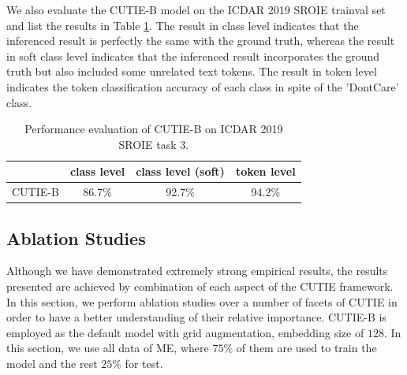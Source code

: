 \documentclass[10pt,twocolumn,letterpaper]{article}
\begin{document}
We also evaluate the CUTIE-B model on the ICDAR 2019 SROIE trainval set and list the results in Table \ref{tab:sroie}. The result in class level indicates that the inferenced result is perfectly the same with the ground truth, whereas the result in soft class level indicates that the inferenced result incorporates the ground truth but also included some unrelated text tokens. The result in token level indicates the token classification accuracy of each class in spite of the 'DontCare' class.
\begin{table}
	\caption{Performance evaluation of CUTIE-B on ICDAR 2019 SROIE task 3.}
\begin{center}
\begin{tabular}{l | c | c | c}
	 & class level & class level (soft) & token level \\
	\hline
	CUTIE-B & 86.7\% & 92.7\% & 94.2\% \\
\end{tabular}
\end{center}
	\label{tab:sroie}
\end{table}

\subsection{Ablation Studies}
Although we have demonstrated extremely strong empirical results, the results presented are achieved by combination of each aspect of the CUTIE framework. In this section, we perform ablation studies over a number of facets of CUTIE in order to have a better understanding of their relative importance. CUTIE-B is employed as the default model with grid augmentation, embedding size of $128$. In this section, we use all data of ME, where $75\%$ of them are used to train the model and the rest $25\%$ for test.
\end{document}
